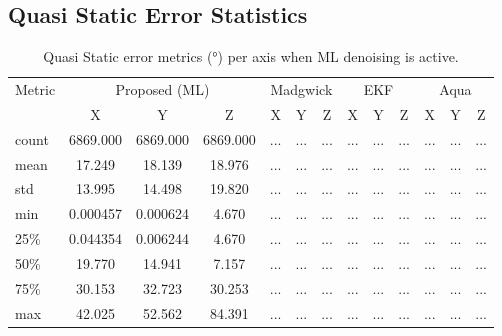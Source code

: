 \documentclass{iutbscthesis}
\begin{document}
\subsection{Quasi Static Error Statistics}
\begin{table}[H]
\centering
\caption{Quasi Static error metrics (°) per axis when ML denoising is active.}
\label{tab:quasi_ml}
\begin{tabular}{l
  *{4}{ccc}
}
\toprule
Metric & \multicolumn{3}{c}{Proposed (ML)} & \multicolumn{3}{c}{Madgwick} & \multicolumn{3}{c}{EKF} & \multicolumn{3}{c}{Aqua} \\
 & X & Y & Z & X & Y & Z & X & Y & Z & X & Y & Z \\
\midrule
count & 6869.000 & 6869.000 & 6869.000 & ... & ... & ... & ... & ... & ... & ... & ... & ... \\
mean & 17.249 & 18.139 & 18.976 & ... & ... & ... & ... & ... & ... & ... & ... & ... \\
std & 13.995 & 14.498 & 19.820 & ... & ... & ... & ... & ... & ... & ... & ... & ... \\
min & 0.000457 & 0.000624 & 4.670 & ... & ... & ... & ... & ... & ... & ... & ... & ... \\
25\% & 0.044354 & 0.006244 & 4.670 & ... & ... & ... & ... & ... & ... & ... & ... & ... \\
50\% & 19.770 & 14.941 & 7.157 & ... & ... & ... & ... & ... & ... & ... & ... & ... \\
75\% & 30.153 & 32.723 & 30.253 & ... & ... & ... & ... & ... & ... & ... & ... & ... \\
max & 42.025 & 52.562 & 84.391 & ... & ... & ... & ... & ... & ... & ... & ... & ... \\
\bottomrule
\end{tabular}
\end{table}
\end{document}
